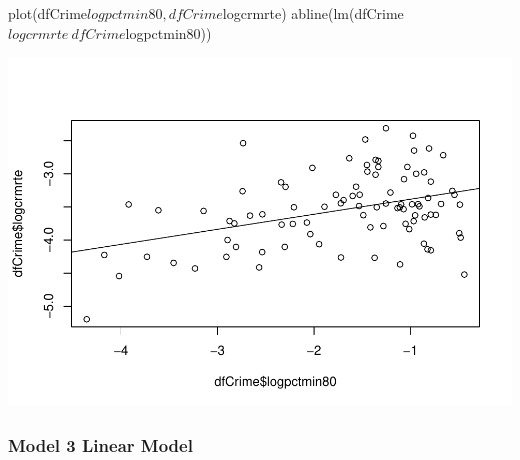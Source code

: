 \documentclass[]{article}
\newenvironment{Shaded}{}{}
\newcommand{\CommentTok}[1]{\textcolor[rgb]{0.00,0.50,0.00}{#1}}
\newcommand{\KeywordTok}[1]{\textcolor[rgb]{0.00,0.00,1.00}{#1}}
\newcommand{\NormalTok}[1]{#1}
\newcommand{\OperatorTok}[1]{#1}
\begin{document}
\begin{Shaded}
\begin{Highlighting}[]
\KeywordTok{plot}\NormalTok{(dfCrime}\OperatorTok{$}\NormalTok{logpctmin80, dfCrime}\OperatorTok{$}\NormalTok{logcrmrte)}
\KeywordTok{abline}\NormalTok{(}\KeywordTok{lm}\NormalTok{(dfCrime}\OperatorTok{$}\NormalTok{logcrmrte}\OperatorTok{~}\NormalTok{dfCrime}\OperatorTok{$}\NormalTok{logpctmin80))}
\end{Highlighting}
\end{Shaded}

\includegraphics{Bagnard_Gaustad_Hartman_Leung_Lab_3_files/figure-latex/unnamed-chunk-98-2.pdf}

\hypertarget{model-3-linear-model}{%
\subsubsection{Model 3 Linear Model}\label{model-3-linear-model}}

\begin{Shaded}
\end{Shaded}
\end{document}
